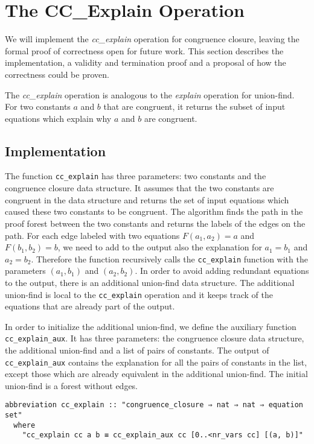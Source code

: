 \chapter{The CC\_Explain Operation}

We will implement the \emph{cc\_explain} operation for congruence closure, leaving the formal proof of correctness open for future work.  This section describes the implementation, a validity and termination proof and a proposal of how the correctness could be proven.

The \emph{cc\_explain} operation is analogous to the \emph{explain} operation for union-find. For two constants $a$ and $b$ that are congruent, it returns the subset of input equations which explain why $a$ and $b$ are congruent.

\section{Implementation}

The function \lstinline{cc_explain} has three parameters: two constants and the congruence closure data structure.
It assumes that the two constants are congruent in the data structure and returns the set of input equations which caused these two constants to be congruent. The algorithm finds the path in the proof forest between the two constants and returns the labels of the edges on the path. For each edge labeled with two equations $F(a_1, a_2) = a$ and $F(b_1, b_2) = b$, we need to add to the output also the explanation for $a_1 = b_1$ and $a_2 = b_2$. Therefore the function recursively calls the \lstinline{cc_explain} function with the parameters $(a_1, b_1)$ and $(a_2, b_2)$. In order to avoid adding redundant equations to the output, there is an additional union-find data structure. The additional union-find is local to the \lstinline{cc_explain} operation and it keeps track of the equations that are already part of the output.

In order to initialize the additional union-find, we define the auxiliary function \lstinline{cc_explain_aux}. It has three parameters: the congruence closure data structure, the additional union-find and a list of pairs of constants. The output of \lstinline{cc_explain_aux} contains the explanation for all the pairs of constants in the list, except those which are already equivalent in the additional union-find. The initial union-find is a forest without edges.

\begin{lstlisting}
abbreviation cc_explain :: "congruence_closure ⇒ nat ⇒ nat ⇒ equation set"
  where
    "cc_explain cc a b ≡ cc_explain_aux cc [0..<nr_vars cc] [(a, b)]"
\end{lstlisting}

